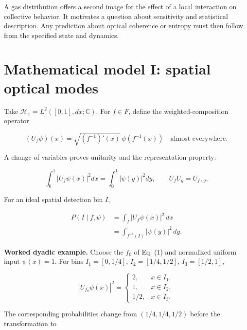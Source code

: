 \documentclass[11pt,a4paper]{article}
\begin{document}
A gas distribution offers a second image for the effect of a local interaction on collective behavior. It motivates a question about sensitivity and statistical description. Any prediction about optical coherence or entropy must then follow from the specified state and dynamics.

\hypertarget{mathematical-model-i-spatial-optical-modes}{%
\section{Mathematical model I: spatial optical modes}\label{mathematical-model-i-spatial-optical-modes}}

Take \(\mathcal H_x=L^2([0,1],dx;\mathbb C)\). For \(f\in F\), define the weighted-composition operator

\begin{equation}\label{eq:17}
\boxed{(U_f\psi)(x)=\sqrt{(f^{-1})'(x)}\,\psi(f^{-1}(x))}
\quad\text{almost everywhere}.
\end{equation}

A change of variables proves unitarity and the representation property:

\begin{equation}\label{eq:18}
\int_0^1|U_f\psi(x)|^2dx=\int_0^1|\psi(y)|^2dy,\qquad
U_fU_g=U_{f\circ g}.
\end{equation}

For an ideal spatial detection bin \(I\),

\begin{equation}\label{eq:19}
\begin{aligned}
P(I\mid f,\psi)
&=\int_I |U_f\psi(x)|^2\,dx\\
&=\int_{f^{-1}(I)} |\psi(y)|^2\,dy.
\end{aligned}
\end{equation}

\textbf{Worked dyadic example.} Choose the \(f_0\) of Eq. (1) and normalized uniform input \(\psi(x)=1\). For bins \(I_1=[0,1/4]\), \(I_2=[1/4,1/2]\), \(I_3=[1/2,1]\),

\begin{equation}\label{eq:20}
|U_{f_0}\psi(x)|^2=
\begin{cases}
2,&x\in I_1,\\
1,&x\in I_2,\\
1/2,&x\in I_3.
\end{cases}
\end{equation}

The corresponding probabilities change from \((1/4,1/4,1/2)\) before the transformation to
\end{document}
